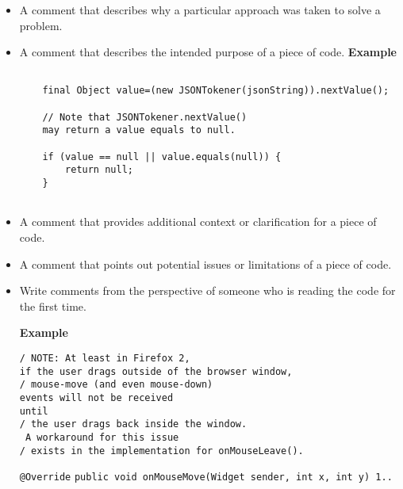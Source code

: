 \begin{itemize}
	\item  A comment that describes why a particular approach was taken to
	solve a problem.
	\item A comment that describes the intended purpose of a piece of code.
	\textbf {Example}

\begin{verbatim}
	
	final Object value=(new JSONTokener(jsonString)).nextValue();
	
	// Note that JSONTokener.nextValue() 
	may return a value equals to null.
	
	if (value == null || value.equals(null)) {
		return null;
	}
	
\end{verbatim}

	\item A comment that provides additional context or clarification for a
	piece of code.
	\item A comment that points out potential issues or limitations of a piece
	of code.	
	\item Write comments from the perspective of someone who is reading the
	code for the first time. \cite{Villalobos:2019}
	
	\textbf {Example}
\begin{center}
\begin{verbatim}
/ NOTE: At least in Firefox 2,
if the user drags outside of the browser window,
/ mouse-move (and even mouse-down) 
events will not be received
until
/ the user drags back inside the window.
 A workaround for this issue
/ exists in the implementation for onMouseLeave().
\end{verbatim}
	\texttt{@Override}
	\texttt{public void onMouseMove(Widget sender, int x, int y) 1..}
\end{center}


	
\end{itemize}


